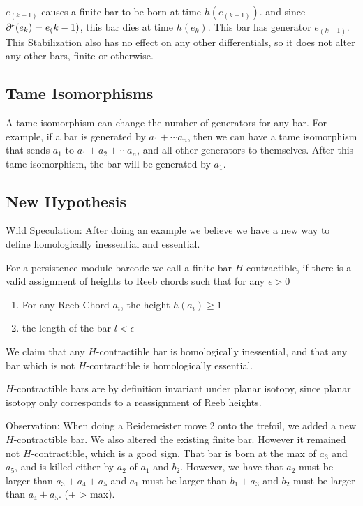 \documentclass[11pt,oneside]{amsart}
\begin{document}
    $e_(k-1)$ causes a finite bar to be born at time $h(e_(k-1))$. and since $\partial^\epsilon (e_k) = e_(k-1)$, this bar dies at time $h(e_k)$. This bar has generator $e_(k-1)$. This Stabilization also has no effect on any other differentials, so it does not alter any other bars, finite or otherwise.

\subsection{Tame Isomorphisms}

    A tame isomorphism can change the number of generators for any bar. For example, if a bar is generated by $a_1 + \cdots a_n$, then we can have a tame isomorphism that sends $a_1$ to $a_1 + a_2 + \cdots a_n$, and all other generators to themselves. After this tame isomorphism, the bar will be generated by $a_1$.

\subsection{New Hypothesis}

Wild Speculation:
    After doing an example we believe we have a new way to define homologically inessential and essential.

    \begin{definition}
        For a persistence module barcode we call a finite bar $H$-contractible, if there is a valid assignment of heights to Reeb chords such that for any $\epsilon > 0$
        \begin{enumerate}
            \item For any Reeb Chord $a_i$, the height $h(a_i) \geq 1$
            \item the length of the bar $l < \epsilon$
        \end{enumerate}
    \end{definition}

    We claim that any $H$-contractible bar is homologically inessential, and that any bar which is not $H$-contractible is homologically essential.

$H$-contractible bars are by definition invariant under planar isotopy, since planar isotopy only corresponds to a reassignment of Reeb heights.

Observation: When doing a Reidemeister move 2 onto the trefoil, we added a new $H$-contractible bar. We also altered the existing finite bar. However it remained not $H$-contractible, which is a good sign. That bar is born at the max of $a_3$ and $a_5$, and is killed either by $a_2$ of $a_1$ and $b_2$. However, we have that $a_2$ must be larger than $a_3 + a_4 + a_5$ and $a_1$ must be larger than $b_1 + a_3 $ and $b_2$ must be larger than $a_4 + a_5$. (+ > max).
\end{document}
